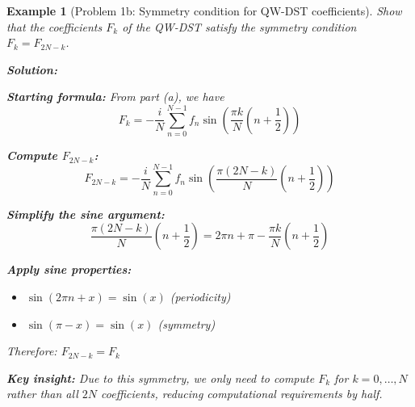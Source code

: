 \documentclass[11pt,a4paper]{article}
\newtheorem{example}[theorem]{Example}
\begin{document}
\begin{example}[Problem 1b: Symmetry condition for QW-DST coefficients]
Show that the coefficients $F_k$ of the QW-DST satisfy the symmetry condition $F_k = F_{2N-k}$.

\textbf{Solution:} 

\textbf{Starting formula:} From part (a), we have
$$F_k = -\frac{i}{N} \sum_{n=0}^{N-1} f_n \sin\left(\frac{\pi k}{N}\left(n + \frac{1}{2}\right)\right)$$

\textbf{Compute $F_{2N-k}$:}
$$F_{2N-k} = -\frac{i}{N} \sum_{n=0}^{N-1} f_n \sin\left(\frac{\pi (2N-k)}{N}\left(n + \frac{1}{2}\right)\right)$$

\textbf{Simplify the sine argument:}
$$\frac{\pi (2N-k)}{N}\left(n + \frac{1}{2}\right) = 2\pi n + \pi - \frac{\pi k}{N}\left(n + \frac{1}{2}\right)$$

\textbf{Apply sine properties:}
\begin{itemize}
\item $\sin(2\pi n + x) = \sin(x)$ (periodicity)
\item $\sin(\pi - x) = \sin(x)$ (symmetry)
\end{itemize}

Therefore: $F_{2N-k} = F_k$

\textbf{Key insight:} Due to this symmetry, we only need to compute $F_k$ for $k = 0, \ldots, N$ rather than all $2N$ coefficients, reducing computational requirements by half.
\end{example}
\end{document}

